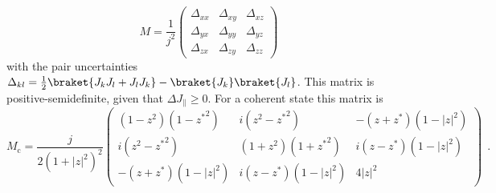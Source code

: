 \begin{equation}
   M= \frac{1}{j^2}
  \begin{pmatrix}
  \Delta_{xx} & \Delta_{xy} & \Delta_{xz} \\
  \Delta_{yx} & \Delta_{yy} & \Delta_{yz} \\
  \Delta_{zx} & \Delta_{zy} & \Delta_{zz}
  \end{pmatrix}
\end{equation}
with the pair uncertainties $\Delta_{kl} = \frac{1}{2}\braket{J_k J_l + J_l J_k} - \braket{J_k}\braket{J_l}$.
This matrix is positive-semidefinite, given that $\Delta J_\parallel \geq 0$.
For a coherent state this matrix is 
\begin{equation}
   M_\text{c} = \frac{j}{2\left( 1 + |z|^2\right)^2}
  \begin{pmatrix}
  \left(1-z^2\right)\left(1-{z^*}^2\right)	&	i\left(z^2 - {z^*}^2\right)			&	-\left(z + z^*\right)\left(1-|z|^2\right) 	\\
  i\left(z^2 - {z^*}^2\right)			&	\left(1 + z^2\right)\left(1+{z^*}^2\right)	&	i\left(z - z^*\right) \left( 1 - |z|^2\right)	\\
  -\left(z + z^*\right)\left(1-|z|^2\right)	&i\left(z - z^*\right) \left( 1 - |z|^2\right)		&	4|z|^2
  \end{pmatrix}~~.
\end{equation}

